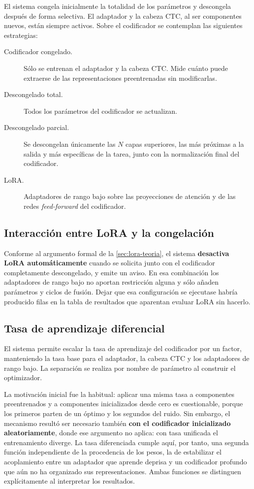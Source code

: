 El sistema congela inicialmente la totalidad de los parámetros y descongela después de forma selectiva. El adaptador y la cabeza CTC, al ser componentes nuevos, están siempre activos. Sobre el codificador se contemplan las siguientes estrategias:

\begin{description}
  \item[Codificador congelado.] Sólo se entrenan el adaptador y la cabeza CTC. Mide cuánto puede extraerse de las representaciones preentrenadas sin modificarlas.
  \item[Descongelado total.] Todos los parámetros del codificador se actualizan.
  \item[Descongelado parcial.] Se descongelan únicamente las $N$ capas superiores, las más próximas a la salida y más específicas de la tarea, junto con la normalización final del codificador.
  \item[LoRA.] Adaptadores de rango bajo sobre las proyecciones de atención y de las redes \textit{feed-forward} del codificador.
\end{description}

\subsection{Interacción entre LoRA y la congelación}

Conforme al argumento formal de la \cref{sec:lora-teoria}, el sistema \textbf{desactiva LoRA automáticamente} cuando se solicita junto con el codificador completamente descongelado, y emite un aviso. En esa combinación los adaptadores de rango bajo no aportan restricción alguna y sólo añaden parámetros y ciclos de fusión. Dejar que esa configuración se ejecutase habría producido filas en la tabla de resultados que aparentan evaluar LoRA sin hacerlo.

\subsection{Tasa de aprendizaje diferencial}

El sistema permite escalar la tasa de aprendizaje del codificador por un factor, manteniendo la tasa base para el adaptador, la cabeza CTC y los adaptadores de rango bajo. La separación se realiza por nombre de parámetro al construir el optimizador.

La motivación inicial fue la habitual: aplicar una misma tasa a componentes preentrenados y a componentes inicializados desde cero es cuestionable, porque los primeros parten de un óptimo y los segundos del ruido. Sin embargo, el mecanismo resultó ser necesario también \textbf{con el codificador inicializado aleatoriamente}, donde ese argumento no aplica: con tasa unificada el entrenamiento diverge. La tasa diferenciada cumple aquí, por tanto, una segunda función independiente de la procedencia de los pesos, la de estabilizar el acoplamiento entre un adaptador que aprende deprisa y un codificador profundo que aún no ha organizado sus representaciones. Ambas funciones se distinguen explícitamente al interpretar los resultados.

